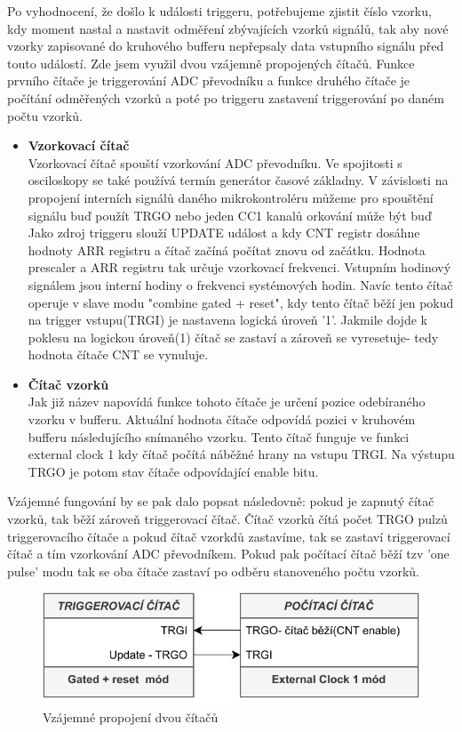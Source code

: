 Po vyhodnocení, že došlo k události triggeru, potřebujeme zjistit číslo vzorku, kdy moment nastal a nastavit odměření zbývajících vzorků signálů, tak aby nové vzorky zapisované do kruhového bufferu nepřepsaly data vstupního signálu před touto událostí. Zde jsem využil dvou vzájemně propojených čítačů. Funkce prvního čítače je triggerování ADC převodníku a funkce druhého čítače je počítání odměřených vzorků a poté po triggeru zastavení triggerování po daném počtu vzorků. 

\begin{itemize}
	\item \textbf{Vzorkovací čítač }\\
	Vzorkovací čítač spouští vzorkování ADC převodníku. Ve spojitosti s osciloskopy se také používá termín generátor časové základny. V závislosti na propojení interních signálů daného mikrokontroléru můžeme pro spouštění signálu buď použít TRGO nebo jeden CC1 kanalů orkování může být buď Jako zdroj triggeru slouží UPDATE událost a kdy CNT registr dosáhne hodnoty ARR registru a čítač začíná počítat znovu od začátku. Hodnota prescaler a ARR registru tak určuje vzorkovací frekvenci. Vstupním hodinový signálem jsou interní hodiny o frekvenci systémových hodin. Navíc tento čítač operuje v slave modu "combine gated + reset", kdy tento čítač běží jen pokud na trigger vstupu(TRGI) je nastavena logická úroveň '1'. Jakmile dojde k poklesu na logickou úroveň(1) čítač se zastaví a zároveň se vyresetuje- tedy hodnota čítače CNT se vynuluje.
	
	\item \textbf{Čítač vzorků}\\
	Jak již název napovídá funkce tohoto čítače je určení pozice odebíraného vzorku v bufferu. Aktuální hodnota čítače odpovídá pozici v kruhovém bufferu následujícího snímaného vzorku. Tento čítač funguje ve funkci external clock 1 kdy čítač počítá náběžné hrany na vstupu TRGI. Na výstupu TRGO je potom stav čítače odpovídající enable bitu.
\end{itemize}

Vzájemné fungování by se pak dalo popsat následovně: pokud je zapnutý čítač vzorků, tak běží zároveň triggerovací čítač. Čítač vzorků čítá počet TRGO pulzů triggerovacího čítače a pokud čítač vzorkdů zastavíme, tak se zastaví triggerovací čítač a tím vzorkování ADC převodníkem. Pokud pak počítací čítač běží tzv 'one pulse' modu tak se oba čítače zastaví po odběru stanoveného počtu vzorků. 
\begin{figure}
	\centering
	\includegraphics[width=0.5\linewidth]{Figs/Diagrams/SamplingTimers_TRGI_TRGO}
	\caption{Vzájemné propojení dvou čítačů}
	\label{fig:samplingtimerstrgitrgo}
\end{figure}


